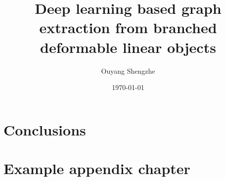 \documentclass[ a4paper,
                oneside,
                toc=bibliography,
                toc=listof
                ]{scrbook}
\author{Ouyang Shengzhe}
\title{Deep learning based graph extraction from branched deformable linear objects}
\date{\today}
\begin{document}
 
    \frontmatter
    \makeISWtitle

	\cleardoublepage
	\setcounter{page}{1} %
    \declarationOfOriginality

    
    
    \cleardoublepage
    \tableofcontents
       

    \mainmatter
    


    
    
    
    
    
    
    
    \chapter{Conclusions}

    
    \cleardoublepage
    \printbibliography
    
     \cleardoublepage
    
    
    \cleardoublepage
    \listoffigures
    
    \cleardoublepage
    \listoftables
    
    
    
    \appendix
    \chapter{Example appendix chapter}
\end{document}
